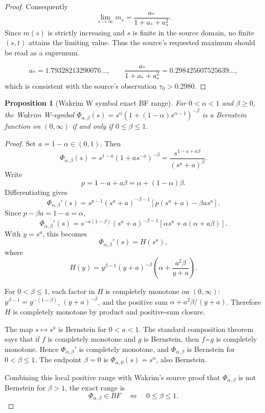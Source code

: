 \documentclass[11pt]{article}
\numberwithin{equation}{section}
\newtheorem{proposition}[theorem]{Proposition}
\theoremstyle{definition}
\theoremstyle{remark}
\newcommand{\1}{\mathbf 1}
\begin{document}
\begin{proof}
Consequently
\[
\lim_{s\to\infty}m_s
=\frac{a_*}{1+a_*+a_*^2}.
\]
Since \(m(s)\) is strictly increasing and \(s\) is finite in the source domain, no finite \((s,t)\) attains the limiting value. Thus the source's requested maximum should be read as a supremum.

\[
a_*=1.79328213290076\ldots,\qquad
\frac{a_*}{1+a_*+a_*^2}=0.298425607525639\ldots,
\]
which is consistent with the source's observation \(\tau_0>0.2980\).
\end{proof}

\begin{proposition}[Wakrim W symbol exact BF range]
\label{res:wakrim-w-symbol-exact-bf-range}
For \(0<\alpha<1\) and \(\beta\ge0\), the Wakrim W-symbol \(\Phi_{\alpha,\beta}(s)=s^\alpha(1+(1-\alpha)s^{\alpha-1})^{-\beta}\) is a Bernstein function on \((0,\infty)\) if and only if \(0\le\beta\le1\).
\end{proposition}

\begin{proof}
Set \(a=1-\alpha\in(0,1)\). Then
\[
\Phi_{\alpha,\beta}(s)
=s^{1-a}\left(1+a s^{-a}\right)^{-\beta}
=\frac{s^{1-a+a\beta}}{(s^a+a)^\beta}.
\]
Write
\[
p=1-a+a\beta=\alpha+(1-\alpha)\beta.
\]
Differentiating gives
\[
\Phi_{\alpha,\beta}'(s)
=s^{p-1}(s^a+a)^{-\beta-1}
\left[p(s^a+a)-\beta a s^a\right].
\]
Since \(p-\beta a=1-a=\alpha\),
\[
\Phi_{\alpha,\beta}'(s)
=s^{-a(1-\beta)}(s^a+a)^{-\beta-1}
\left[\alpha s^a+a(\alpha+a\beta)\right].
\]
With \(y=s^a\), this becomes
\[
\Phi_{\alpha,\beta}'(s)=H(s^a),
\]
where
\[
H(y)=
y^{\beta-1}(y+a)^{-\beta}
\left(\alpha+\frac{a^2\beta}{y+a}\right).
\]

For \(0<\beta\le1\), each factor in \(H\) is completely monotone on \((0,\infty)\): \(y^{\beta-1}=y^{-(1-\beta)}\), \((y+a)^{-\beta}\), and the positive sum \(\alpha+a^2\beta/(y+a)\). Therefore \(H\) is completely monotone by product and positive-sum closure.

The map \(s\mapsto s^a\) is Bernstein for \(0<a<1\). The standard composition theorem says that if \(f\) is completely monotone and \(g\) is Bernstein, then \(f\circ g\) is completely monotone. Hence \(\Phi_{\alpha,\beta}'\) is completely monotone, and \(\Phi_{\alpha,\beta}\) is Bernstein for \(0<\beta\le1\). The endpoint \(\beta=0\) is \(\Phi_{\alpha,0}(s)=s^\alpha\), also Bernstein.

Combining this local positive range with Wakrim's source proof that \(\Phi_{\alpha,\beta}\) is not Bernstein for \(\beta>1\), the exact range is
\[
\Phi_{\alpha,\beta}\in BF
\quad\Longleftrightarrow\quad
0\le\beta\le1.
\]
\end{proof}
\end{document}
